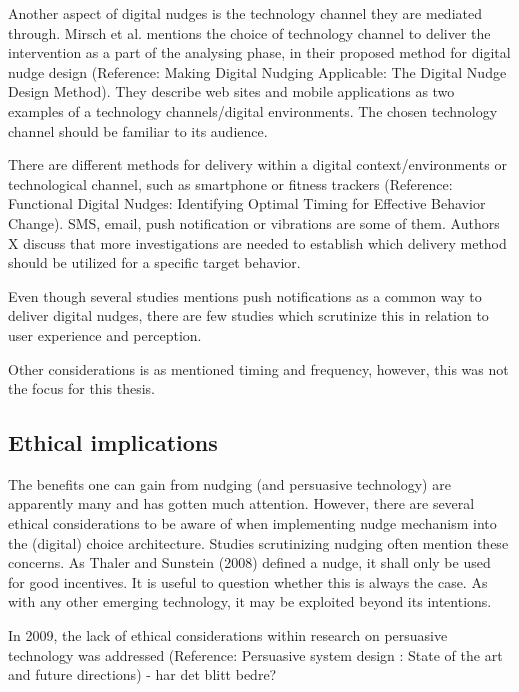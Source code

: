 {Another aspect of digital nudges is the technology channel they are mediated through. Mirsch et al. mentions the choice of technology channel to deliver the intervention as a part of the analysing phase, in their proposed method for digital nudge design (Reference: Making Digital Nudging Applicable: The Digital Nudge Design Method). They describe web sites and mobile applications as two examples of a technology channels/digital environments. The chosen technology channel should be familiar to its audience. 

There are different methods for delivery within a digital context/environments or technological channel, such as smartphone or fitness trackers (Reference: Functional Digital Nudges: Identifying Optimal Timing for Effective Behavior Change). SMS, email, push notification or vibrations are some of them. Authors X discuss that more investigations are needed to establish which delivery method should be utilized for a specific target behavior. 

Even though several studies mentions push notifications as a common way to deliver digital nudges, there are few studies which scrutinize this in relation to user experience and perception. 

Other considerations is as mentioned timing and frequency, however, this was not the focus for this thesis.  

\subsection{Ethical implications}
The benefits one can gain from nudging (and persuasive technology) are apparently many and has gotten much attention.  However, there are several ethical considerations to be aware of when implementing nudge mechanism into the (digital) choice architecture. Studies scrutinizing nudging often mention these concerns. As Thaler and Sunstein (2008) defined a nudge, it shall only be used for good incentives. It is useful to question whether this is always the case. As with any other emerging technology, it may be exploited beyond its intentions. 

In 2009, the lack of ethical considerations within research on persuasive technology was addressed (Reference: Persuasive system design : State of the art and future directions) - har det blitt bedre? 

}
